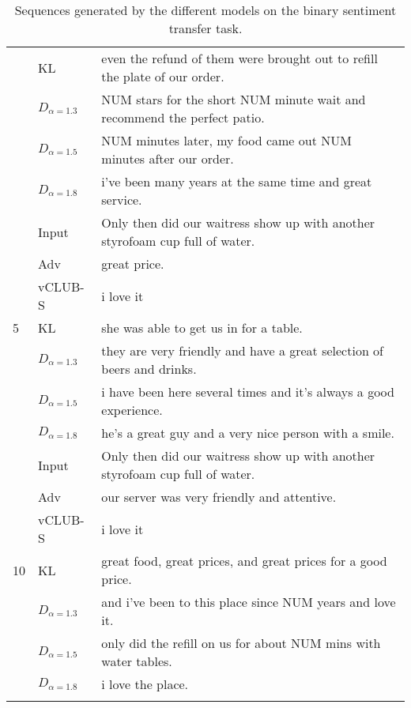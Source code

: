 \begin{table}
{\begin{tabular}{ll|l}
&KL  &   even the refund of them were brought out to refill the plate of our order. \\
&$D_{\alpha=1.3}$  &  NUM stars for the short NUM minute wait and recommend the perfect patio. \\
&$D_{\alpha=1.5}$  & 	NUM minutes later, my food came out NUM minutes after our order.  \\
&$D_{\alpha=1.8}$  &  i've been many years at the same time and great service. \\\hline
\multirow{7}{*}{5} &Input  &  Only then did our waitress show up with another styrofoam cup full of water.   \\ \hline
&Adv  &  great price. \\
&vCLUB-S  & i love it \\
&KL  &  she was able to get us in for a table. \\ 
&$D_{\alpha=1.3}$  & 	they are very friendly and have a great selection of beers and drinks. \\ 
&$D_{\alpha=1.5}$  &  i have been here several times and it's always a good experience. \\
&$D_{\alpha=1.8}$  &  	he's a great guy and a very nice person with a smile. \\\hline
\multirow{7}{*}{10} &Input  &  Only then did our waitress show up with another styrofoam cup full of water.   \\\hline
&Adv  & our server was very friendly and attentive.  \\
&vCLUB-S  & i love it \\
&KL  &  great food, great prices, and great prices for a good price. \\
&$D_{\alpha=1.3}$  &  and i've been to this place since NUM  years and love it. \\
&$D_{\alpha=1.5}$  &  only did the refill on us for about NUM mins with water tables. \\
&$D_{\alpha=1.8}$  & 	i love the place.  \\\hline\hline

\fi
\end{tabular}}
\caption{Sequences generated by the different models on the binary sentiment transfer task.}
\label{tab:example_sentences_st}
\end{table} \iffalse
\vspace{-4mm}
